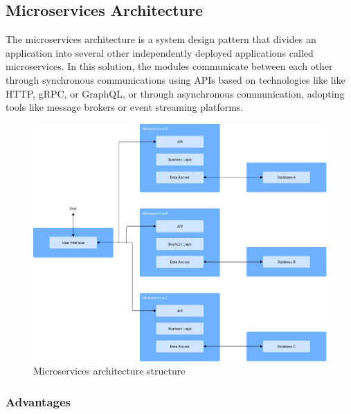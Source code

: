 \subsection{Microservices Architecture}
The microservices architecture is a system design pattern that divides an
application into several other independently deployed applications called
microservices\cite{7436659}.
In this solution, the modules communicate between each other through
synchronous communications using \gls{API}s based on technologies like like
\gls{HTTP}, \gls{gRPC}, or GraphQL, or through asynchronous communication,
adopting tools like message brokers or event streaming platforms\cite{7436659}.

\begin{figure}[htbp]
	\centering
	\includegraphics[width=\textwidth, height=0.5\textheight, keepaspectratio]{Chapters/Figures/Architectures/microservices.pdf}
	\caption{Microservices architecture structure}
	\label{fig:architectures:microservices}
\end{figure}

\subsubsection{Advantages}

